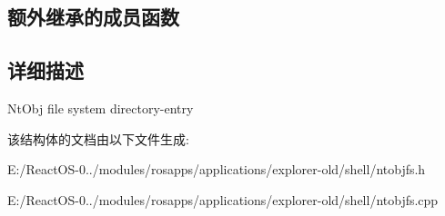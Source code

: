 \subsection*{额外继承的成员函数}


\subsection{详细描述}
Nt\+Obj file system directory-\/entry 

该结构体的文档由以下文件生成\+:\begin{DoxyCompactItemize}
\item 
E\+:/\+React\+O\+S-\/0../modules/rosapps/applications/explorer-\/old/shell/ntobjfs.\+h\item 
E\+:/\+React\+O\+S-\/0../modules/rosapps/applications/explorer-\/old/shell/ntobjfs.\+cpp\end{DoxyCompactItemize}
